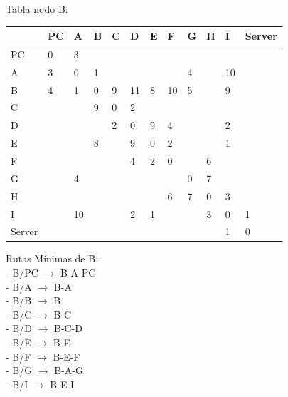 \documentclass[a4paper]{article}
\begin{document}
\begin{table}[ht]
Tabla nodo B:\\
\begin{tabular}{|l|l|l|l|l|l|l|l|l|l|l|l|}
\hline
       & PC & A  & B & C & D  & E & F  & G & H & I  & Server \\ \hline
PC     & 0  & 3  &   &   &    &   &    &   &   &    &        \\ \hline
A      & 3  & 0  & 1 &   &    &   &    & 4 &   & 10 &        \\ \hline
B      & 4  & 1  & 0 & 9 & 11 & 8 & 10 & 5 &   & 9  &        \\ \hline
C      &    &    & 9 & 0 & 2  &   &    &   &   &    &        \\ \hline
D      &    &    &   & 2 & 0  & 9 & 4  &   &   & 2  &        \\ \hline
E      &    &    & 8 &   & 9  & 0 & 2  &   &   & 1  &        \\ \hline
F      &    &    &   &   & 4  & 2 & 0  &   & 6 &    &        \\ \hline
G      &    & 4  &   &   &    &   &    & 0 & 7 &    &        \\ \hline
H      &    &    &   &   &    &   & 6  & 7 & 0 & 3  &        \\ \hline
I      &    & 10 &   &   & 2  & 1 &    &   & 3 & 0  & 1      \\ \hline
Server &    &    &   &   &    &   &    &   &   & 1  & 0      \\ \hline
\end{tabular}

Rutas Mínimas de B:\\
-	B/PC  $\rightarrow$  B-A-PC\\
-	B/A  $\rightarrow$  B-A\\
-	B/B  $\rightarrow$  B\\
-	B/C  $\rightarrow$  B-C\\
-	B/D  $\rightarrow$  B-C-D\\
-	B/E  $\rightarrow$  B-E\\
-	B/F  $\rightarrow$  B-E-F\\
-	B/G  $\rightarrow$  B-A-G\\
-	B/I  $\rightarrow$  B-E-I\\
\end{table}
\end{document}
